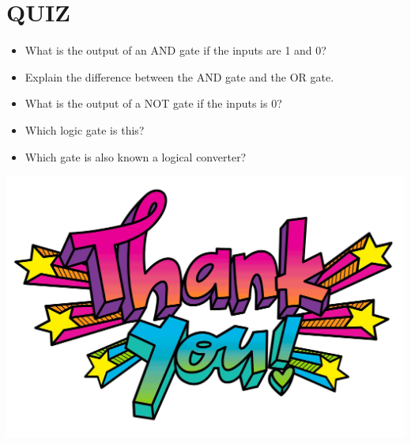 \documentclass{article}
\begin{document}
\section{QUIZ}

\begin{itemize}
	
	\item What is the output of an AND gate if the inputs are 1 and 0?
	\item Explain the difference between the AND gate and the OR gate.
	\item What is the output of a NOT gate if the inputs is 0?
	\item Which logic gate is this?
	\item Which gate is also known 
	a logical converter?
	
\end{itemize}

\centering\includegraphics{24}

\newpage


\end{document}

